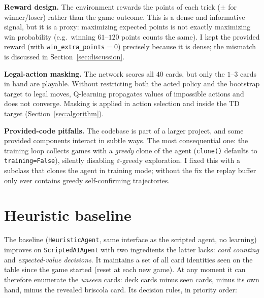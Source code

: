 \documentclass{article}
\begin{document}
\textbf{Reward design.} The environment rewards the points of each trick ($\pm$ for winner/loser) rather than the game outcome. This is a dense and informative signal, but it is a proxy: maximizing expected points is not exactly maximizing win probability (e.g.\ winning $61$--$120$ points counts the same). I kept the provided reward (with \texttt{win\_extra\_points}$=0$) precisely because it is dense; the mismatch is discussed in Section~\ref{sec:discussion}.

\textbf{Legal-action masking.} The network scores all $40$ cards, but only the $1$--$3$ cards in hand are playable. Without restricting both the acted policy and the bootstrap target to legal moves, Q-learning propagates values of impossible actions and does not converge. Masking is applied in action selection and inside the TD target (Section~\ref{sec:algorithm}).

\textbf{Provided-code pitfalls.} The codebase is part of a larger project, and some provided components interact in subtle ways. The most consequential one: the training loop collects games with a \emph{greedy} clone of the agent (\texttt{clone()} defaults to \texttt{training=False}), silently disabling $\varepsilon$-greedy exploration. I fixed this with a subclass that clones the agent in training mode; without the fix the replay buffer only ever contains greedy self-confirming trajectories.

\section{Heuristic baseline}
\label{sec:baseline}

The baseline (\texttt{HeuristicAgent}, same interface as the scripted agent, no learning) improves on \texttt{ScriptedAIAgent} with two ingredients the latter lacks: \emph{card counting} and \emph{expected-value decisions}. It maintains a set of all card identities seen on the table since the game started (reset at each new game). At any moment it can therefore enumerate the \emph{unseen} cards: deck cards minus seen cards, minus its own hand, minus the revealed briscola card. Its decision rules, in priority order:
\end{document}
